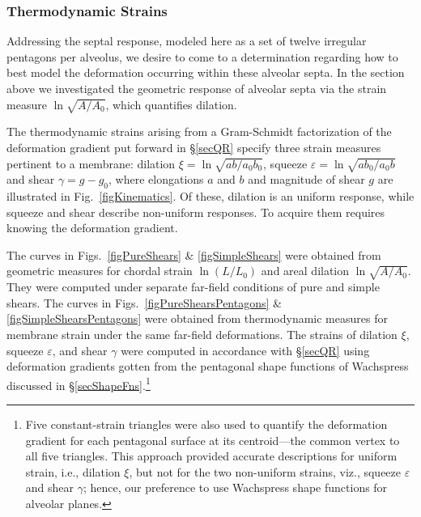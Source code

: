 \subsubsection{Thermodynamic Strains}

Addressing the septal response, modeled here as a set of twelve irregular pentagons per alveolus, we desire to come to a determination regarding how to best model the deformation occurring within these alveolar septa.  In the section above we investigated the geometric response of alveolar septa via the strain measure $\ln \sqrt{A/A_0}$, which quantifies dilation.  

The thermo\-dynamic strains arising from a Gram-Schmidt factorization of the deformation gradient put forward in \S\ref{secQR} specify three strain measures pertinent to a membrane: dilation $\xi = \ln \sqrt{ab/a_0 b_0}$, squeeze $\varepsilon = \ln \sqrt{ab_0 / a_0 b}$ and shear $\gamma = g - g_0$, where elongations $a$ and $b$ and magnitude of shear $g$ are illustrated in Fig.~\ref{figKinematics}.  Of these, dilation is an uniform response, while squeeze and shear describe non-uniform responses.  To acquire them requires knowing the deformation gradient.

The curves in Figs.~\ref{figPureShears} \& \ref{figSimpleShears} were obtained from geometric measures for chordal strain $\ln (L/L_0)$ and areal dilation $\ln \sqrt{A/A_0}$.  They were computed under separate far-field conditions of pure and simple shears.  The curves in Figs.~\ref{figPureShearsPentagons} \& \ref{figSimpleShearsPentagons} were obtained from thermo\-dynamic measures for membrane strain under the same far-field deformations.  The strains of dilation $\xi$, squeeze $\varepsilon$, and shear $\gamma$ were computed in accordance with \S\ref{secQR} using deformation gradients gotten from the pentagonal shape functions of Wachspress \cite{Wachspress75} discussed in \S\ref{secShapeFns}.\footnote{
	Five constant-strain triangles were also used to quantify the deformation gradient for each pentagonal surface at its centroid---the common vertex to all five triangles.  This approach provided accurate descriptions for uniform strain, i.e., dilation $\xi$, but not for the two non-uniform strains, viz., squeeze $\varepsilon$ and shear $\gamma$; hence, our preference to use Wachspress shape functions for alveolar planes.
} 

